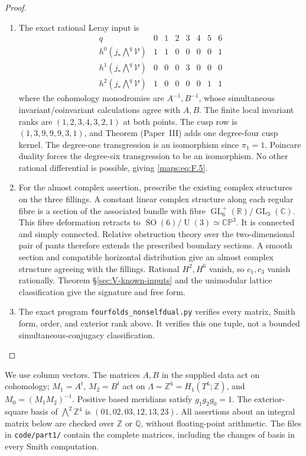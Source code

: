 \documentclass[11pt,a4paper]{article}
\theoremstyle{definition}
\newcommand{\ExternalPaperRef}[3]{\ifmmode\text{\upshape #1#2 (Paper~#3)}\else #1#2 (Paper~#3)\fi}
\begin{document}
\begin{proof}
\begin{enumerate}[label=\arabic*.]
\item The exact rational Leray input is
\[
\begin{array}{c|rrrrrrr}
q&0&1&2&3&4&5&6\\ \hline
h^0(j_*\bigwedge^q\mathcal V)&1&1&0&0&0&0&1\\
h^1(j_*\bigwedge^q\mathcal V)&0&0&0&3&0&0&0\\
h^2(j_*\bigwedge^q\mathcal V)&1&0&0&0&0&1&1
\end{array}
\]
where the cohomology monodromies are $A^{-1},B^{-1}$, whose
simultaneous invariant/coinvariant calculations agree with $A,B$.
The finite local invariant ranks are $(1,2,3,4,3,2,1)$ at both
points.  The cusp row is $(1,3,9,9,9,3,1)$, and Theorem \ExternalPaperRef{}{6.3}{III}
adds one degree-four cusp kernel.  The degree-one transgression
is an isomorphism since $\pi_1=1$.  Poincare duality forces the
degree-six transgression to be an isomorphism.  No other rational
differential is possible, giving \eqref{maps:eq:F.5}.

\item For the almost complex assertion, prescribe the existing complex
structures on the three fillings.  A constant linear complex
structure along each regular fibre is a section of the associated
bundle with fibre
$\operatorname{GL}_6^+(\mathbb R)/\operatorname{GL}_3(\mathbb C)$.
This fibre deformation retracts to
$\operatorname{SO}(6)/\operatorname{U}(3)\simeq\mathbb{CP}^3$.
It is connected and simply connected.  Relative obstruction
theory over the two-dimensional pair of pants therefore extends
the prescribed boundary sections.  A smooth section and compatible
horizontal distribution give an almost complex structure agreeing
with the fillings.  Rational $H^2,H^6$ vanish, so $c_1,c_3$
vanish rationally.  Theorem \S\ref{sec:V-known-inputs} and the unimodular lattice
classification give the signature and free form.

\item The exact program \texttt{fourfolds\_nonselfdual.py} verifies every
matrix, Smith form, order, and exterior rank above.  It verifies
this one tuple, not a bounded simultaneous-conjugacy classification.

\end{enumerate}
\end{proof}


\label{sec:fourfold}

We use column vectors.  The matrices $A,B$ in the supplied data act on
cohomology; $M_1=A^t$, $M_2=B^t$ act on
$\Lambda=\mathbb Z^6=H_1(T^6;\mathbb Z)$, and
$M_0=(M_1M_2)^{-1}$.  Positive based meridians satisfy
$g_1g_2g_0=1$.  The exterior-square basis of $\bigwedge^2\mathbb Z^4$
is $(01,02,03,12,13,23)$.  All assertions about an integral matrix below
are checked over $\mathbb Z$ or $\mathbb Q$, without floating-point
arithmetic.  The files in \texttt{code/part1/} contain the complete
matrices, including the changes of basis in every Smith computation.
\end{document}
